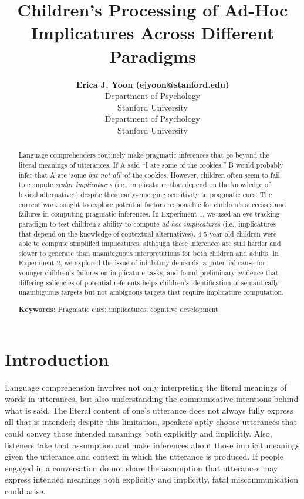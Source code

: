 \documentclass[10pt,letterpaper]{article}
\title{Children's Processing of Ad-Hoc Implicatures \linebreak Across Different Paradigms}
\author{{\large \bf Erica J. Yoon (ejyoon@stanford.edu)} \\
  Department of Psychology \\
  Stanford University
  \AND {\large \bf Michael C. Frank (mcfrank@stanford.edu)} \\
  Department of Psychology \\
  Stanford University}
\begin{document}
\maketitle


\begin{abstract}
Language comprehenders routinely make pragmatic inferences that go beyond the literal meanings of utterances. If A said ``I ate some of the cookies,'' B would probably infer that A ate `some \emph{but not all}' of the cookies. However, children often seem to fail to compute \emph{scalar implicatures} (i.e., implicatures that depend on the knowledge of lexical alternatives) despite their early-emerging sensitivity to pragmatic cues. The current work sought to explore potential factors responsible for children's successes and failures in computing pragmatic inferences. In Experiment 1, we used an eye-tracking paradigm to test children's ability to compute \emph{ad-hoc implicatures} (i.e., implicatures that depend on the knowledge of contextual alternatives). 4-5-year-old children were able to compute simplified implicatures, although these inferences are still harder and slower to generate than unambiguous interpretations for both children and adults. In Experiment 2, we explored the issue of inhibitory demands, a potential cause for younger children's failures on implicature tasks, and found preliminary evidence that differing saliencies of potential referents helps children's identification of semantically unambiguous targets but not ambiguous targets that require implicature computation.

\textbf{Keywords:} 
Pragmatic cues; implicatures; cognitive development

\end{abstract}


\section{Introduction}

Language comprehension involves not only interpreting the literal meanings of words in utterances, but also understanding the communicative intentions behind what is said. The literal content of one's utterance does not always fully express all that is intended; despite this limitation, speakers aptly choose utterances that could convey those intended meanings both explicitly and implicitly. Also, listeners take that assumption and make inferences about those implicit meanings given the utterance and context in which the utterance is produced. If people engaged in a conversation do not share the assumption that utterances may express intended meanings both explicitly and implicitly, fatal miscommunication could arise.
\end{document}

